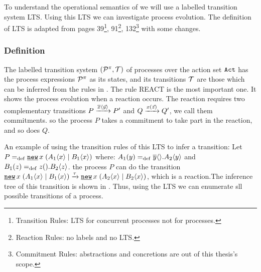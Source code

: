 To understand the operational semantics of \picalc{} we will use  a labelled transition system LTS. Using this LTS we can investigate \picalc{} process evolution. The definition of LTS is adapted from \cite{milner} pages 39\footnote{Transition Rules: LTS for concurrent processes not for \picalc{} processes.}, 91\footnote{Reaction Rules: no labels and no LTS.}, 132\footnote{Commitment Rules: abstractions and concretions are out of this thesis's scope.} with some changes.

\subsubsection{Definition}
\begin{definition}
\label{def_trans_system}

The labelled transition system $(\procs,\traces)$ of \picalc{} processes over the action set $\mathtt{Act}$ has the process expressions $\mathcal P^{\pi}$ as its states, and its transitions $\traces$ are those which can be inferred from the rules in .
The rule REACT is the most important one. It shows the process evolution when a reaction occurs. The reaction requires two complementary transitions $P \xrightarrow{\overline{x}\langle\vec{y}\rangle} P'$ and $Q \xrightarrow{x(\vec{z})} Q'$, we call them commitments. so the process $P$ takes a commitment to take part in the reaction, and so does $Q$.

\end{definition}


An example of using the transition rules of this LTS to infer a transition: Let $P\define\procres{x}{(\procpar{\proccall{A_1}{x}}{\proccall{B_1}{x}})}$ where: $A_1(y)=_{\mathrm{def}}{}\overline{y}\langle{}\rangle.A_2\langle y\rangle$ and $B_1(z)=_{\mathrm{def}}{}z({}).B_2\langle z\rangle$. the process $P$ can do the transition $\procres{x}{(\procpar{\proccall{A_1}{x}}{\proccall{B_1}{x}})} \transs{\tau} \procres{x}{(\procpar{\proccall{A_2}{x}}{\proccall{B_2}{x}})}$, which is a reaction.The inference tree of this transition is shown in . Thus, using the LTS we can enumerate sll possible transitions of a \picalc{} process.



